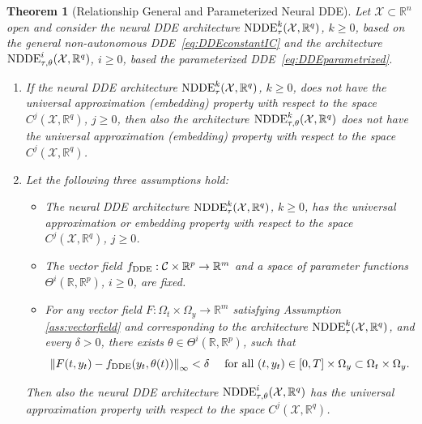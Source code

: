 \documentclass[10pt]{article}
\numberwithin{equation}{section}
\newtheorem{theorem}{Theorem}[section]
\newcommand\norm[1]{\left\lVert#1\right\rVert}
\begin{document}
	
	\begin{theorem}[Relationship General and Parameterized Neural DDE] \label{th:DDEgerenalparameterized}
		Let $\mathcal{X}\subset \mathbb{R}^n$ open and consider the neural DDE architecture $\textup{NDDE}^k_{\tau}(\mathcal{X},\mathbb{R}^q)$, $k\geq 0$, based on the general non-autonomous DDE~\eqref{eq:DDEconstantIC} and the architecture $\textup{NDDE}^i_{\tau,\theta}(\mathcal{X},\mathbb{R}^q)$, $i\geq 0$, based the parameterized DDE~\eqref{eq:DDEparametrized}.
		\begin{enumerate}[label=(\alph*), font=\normalfont]
			\item \label{th:DDEgerenalparameterized_a} If the neural DDE architecture $\textup{NDDE}^k_{\tau}(\mathcal{X},\mathbb{R}^q)$, $k \geq 0$,  does not have the universal approximation (embedding) property with respect to the space $C^j(\mathcal{X}, \mathbb{R}^q)$, $j\geq 0$, then also the architecture $\textup{NDDE}^{k}_{\tau,\theta}(\mathcal{X},\mathbb{R}^q)$ does not have the universal approximation (embedding) property with respect to the space $C^j(\mathcal{X}, \mathbb{R}^q)$.
			\item \label{th:DDEgerenalparameterized_b} Let the following three assumptions hold:
			\begin{itemize}
				\item The neural DDE architecture $\textup{NDDE}^k_{\tau}(\mathcal{X},\mathbb{R}^q)$, $k\geq 0$, has the universal approximation or embedding property with respect to the space $C^j(\mathcal{X}, \mathbb{R}^q)$, $j \geq 0$.
				\item The vector field $f_\textup{DDE}:\mathcal{C}\times \mathbb{R}^{p}\rightarrow \mathbb{R}^m$ and a space of parameter functions $\Theta^i(\mathbb{R},\mathbb{R}^{p})$, $i \geq 0$, are fixed.
				\item For any vector field $F: \Omega_t \times \Omega_y \rightarrow \mathbb{R}^m$ satisfying Assumption \ref{ass:vectorfield} and corresponding to the architecture $\textup{NDDE}^k_{\tau}(\mathcal{X},\mathbb{R}^q)$,  and every  $\delta >0$, there exists $\theta \in \Theta^i(\mathbb{R},\mathbb{R}^{p})$, such that 
				\begin{equation*}
					\norm{F(t,y_t)-f_\textup{DDE}(y_t,\theta(t))}_\infty < \delta \quad \textup{ for all } (t,y_t)\in [0,T] \times \Omega_y \subset \Omega_t \times \Omega_y.
				\end{equation*}
			\end{itemize}
			Then also the neural DDE architecture $\textup{NDDE}^i_{\tau,\theta}(\mathcal{X},\mathbb{R}^q)$ has the universal approximation property with respect to the space $C^j(\mathcal{X}, \mathbb{R}^q)$. 
		\end{enumerate}
	\end{theorem}
	
\end{document}

